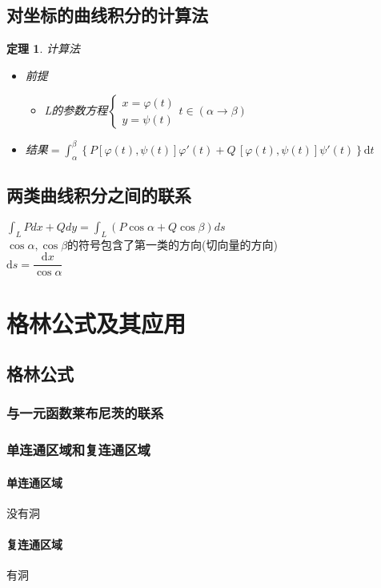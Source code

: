 \documentclass[UTF8,a4paper,12pt,scheme=chinese]{ctexbook}
\newcommand{\ud}{\mathrm{d}}
\newtheorem{theorem}{定理}[section]
\theoremstyle{plain}
\begin{document}
	\subsection{对坐标的曲线积分的计算法}
	\begin{theorem}计算法
		\begin{itemize}
			\item 前提
			\begin{itemize}
				\item L的参数方程$ \left\lbrace \begin{array}{l}
				x=\varphi(t)\\
				y=\psi(t)
				\end{array}\right.t\in(\alpha\rightarrow\beta)  $
			\end{itemize}
			\item 结果$  =\int_\alpha ^\beta \left\{ P[\varphi (t),\psi (t)] \varphi '(t) + Q\,[\varphi (t),\psi (t)]\psi '(t)    \right\}\ud t$
		\end{itemize}
	\end{theorem}
	\subsection{两类曲线积分之间的联系}
	$\int_L {Pdx + Qdy = } \int_L {(P\cos \alpha  + Q\cos \beta )ds} $\\
	$ \cos\alpha,\cos\beta $的符号包含了第一类的方向(切向量的方向)\\
	$ \ud s = \dfrac{\ud x}{\cos\alpha} $
	\section{格林公式及其应用}
	
	\subsection{格林公式}
	\subsubsection{与一元函数莱布尼茨的联系}
	\subsubsection{单连通区域和复连通区域}
	\paragraph{单连通区域}没有洞
	\paragraph{复连通区域}有洞
\end{document}
